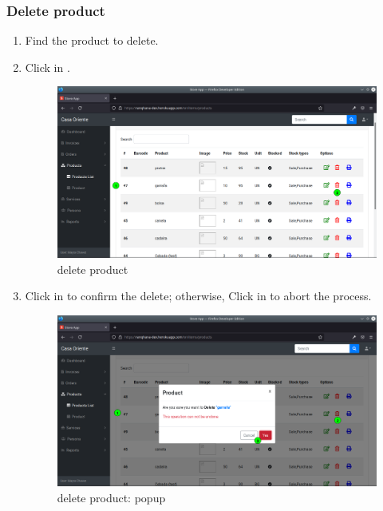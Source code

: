 \documentclass[a4paper,11pt]{refart}
\begin{document}
\subsubsection{Delete product}
\begin{enumerate}
	\item Find the product to delete.
	\item Click in .
		\begin{figure}[H]\centering
			\includegraphics[width=\textwidth]{images/produc_list-delete.png}
			\caption{delete product}
			\label{fig:produc_list-delete.png}
		\end{figure}
	\item Click in  to confirm the delete; otherwise, Click in  to abort the process.
	\begin{figure}[H]\centering
		\includegraphics[width=\textwidth]{images/produc_list-delete-popup.png}
		\caption{delete product: popup}
		\label{fig:produc_list-delete-popup.png}
	\end{figure}
\end{enumerate}
\end{document}

